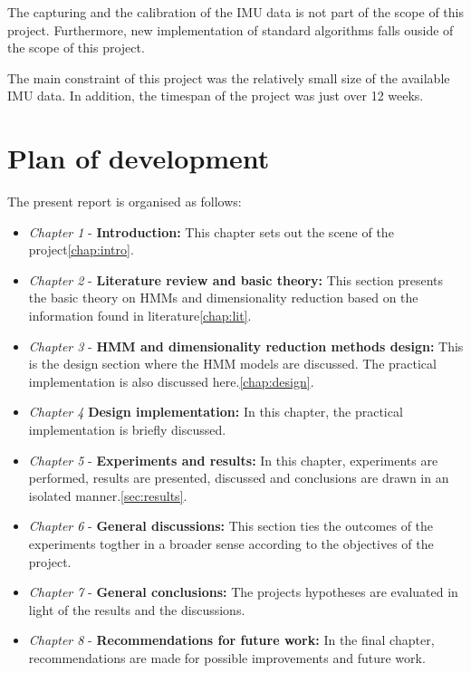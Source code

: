 The capturing and the calibration of the IMU data is not part of the scope of this project. Furthermore, new implementation of standard algorithms falls ouside of the scope of this project. 

The main constraint of this project was the relatively small size of the available IMU data. In addition, the timespan of the project was just over 12 weeks.
\section{Plan of development}
The present report is organised as follows:
\begin{itemize}
	\item \textit{Chapter 1} - \textbf{Introduction:} This chapter sets out the scene of the project\ref{chap:intro}. 
	\item \textit{Chapter 2} - \textbf{Literature review and basic theory:} This section presents the basic theory on HMMs and dimensionality reduction based on the information found in literature\ref{chap:lit}.
	\item \textit{Chapter 3} - \textbf{HMM and dimensionality reduction methods design:} This is the design section where the HMM models are discussed. The practical implementation is also discussed here.\ref{chap:design}.
	\item \textit{Chapter 4}  \textbf{Design implementation:} In this chapter, the practical implementation is briefly discussed.
	\item \textit{Chapter 5} - \textbf{Experiments and results:} In this chapter, experiments are performed, results are presented, discussed and conclusions are drawn in an isolated manner.\ref{sec:results}.
	\item \textit{Chapter 6} - \textbf{General discussions:} This section ties the outcomes of the experiments togther in a broader sense according to the objectives of the project.
	\item \textit{Chapter 7} - \textbf{General conclusions:} The projects hypotheses are evaluated in light of the results and the discussions.
	\item \textit{Chapter 8} - \textbf{Recommendations for future work:} In the final chapter, recommendations are made for possible improvements and future work.
\end{itemize}
